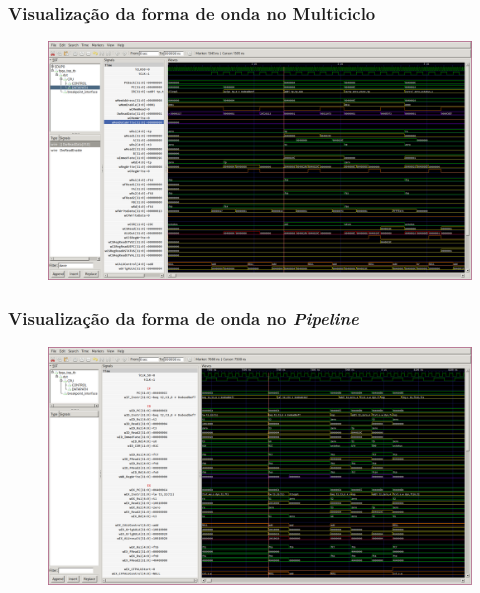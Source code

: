 \documentclass[aspectratio=169]{beamer}
\begin{document}
    \begin{frame}
        \frametitle{Visualização da forma de onda no Multiciclo}
        \vfill
        \begin{figure}[H]
        \centering
            \includegraphics[width=.95\textwidth,height=.85\textheight,keepaspectratio]{../images/gtkwave/gtkwave_multi.png}
        \end{figure}
        \vfill
    \end{frame}

    \begin{frame}
        \frametitle{Visualização da forma de onda no \textit{Pipeline}}
        \vfill
        \begin{figure}[H]
        \centering
            \includegraphics[width=.95\textwidth,height=.85\textheight,keepaspectratio]{../images/gtkwave/gtkwave_pipe.png}
        \end{figure}
        \vfill
    \end{frame}
\end{document}
